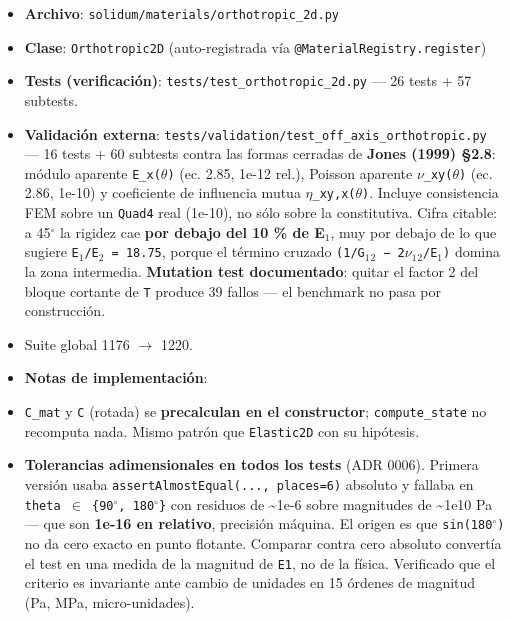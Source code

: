 \documentclass[11pt,letterpaper,oneside]{report}
\begin{document}
\begin{itemize}
  \item \textbf{Archivo}: \texttt{solidum/materials/orthotropic\_2d.py}
  \item \textbf{Clase}: \texttt{Orthotropic2D} (auto-registrada vía \texttt{@MaterialRegistry.register})
  \item \textbf{Tests (verificación)}: \texttt{tests/test\_orthotropic\_2d.py} --- 26 tests + 57 subtests.
  \item \textbf{Validación externa}: \texttt{tests/validation/test\_off\_axis\_orthotropic.py} --- 16 tests + 60 subtests contra las formas cerradas de \textbf{Jones (1999) §2.8}: módulo aparente \texttt{E\_x(\ensuremath{\theta})} (ec. 2.85, 1e-12 rel.), Poisson aparente \texttt{\ensuremath{\nu}\_xy(\ensuremath{\theta})} (ec. 2.86, 1e-10) y coeficiente de influencia mutua \texttt{\ensuremath{\eta}\_xy,x(\ensuremath{\theta})}. Incluye consistencia FEM sobre un \texttt{Quad4} real (1e-10), no sólo sobre la constitutiva. Cifra citable: a 45\ensuremath{^{\circ}} la rigidez cae \textbf{por debajo del 10 \% de E\ensuremath{_{1}}}, muy por debajo de lo que sugiere \texttt{E\ensuremath{_{1}}/E\ensuremath{_{2}} = 18.75}, porque el término cruzado \texttt{(1/G\ensuremath{_{1}}\ensuremath{_{2}} − 2\ensuremath{\nu}\ensuremath{_{1}}\ensuremath{_{2}}/E\ensuremath{_{1}})} domina la zona intermedia. \textbf{Mutation test documentado}: quitar el factor 2 del bloque cortante de \texttt{T} produce 39 fallos --- el benchmark no pasa por construcción.
  \item Suite global 1176 \ensuremath{\to} 1220.
  \item \textbf{Notas de implementación}:
  \item \texttt{C\_mat} y \texttt{C} (rotada) se \textbf{precalculan en el constructor}; \texttt{compute\_state} no recomputa nada. Mismo patrón que \texttt{Elastic2D} con su hipótesis.
  \item \textbf{Tolerancias adimensionales en todos los tests} (ADR 0006). Primera versión usaba \texttt{assertAlmostEqual(..., places=6)} absoluto y fallaba en \texttt{theta \ensuremath{\in} \{90\ensuremath{^{\circ}}, 180\ensuremath{^{\circ}}\}} con residuos de \textasciitilde{}1e-6 sobre magnitudes de \textasciitilde{}1e10 Pa --- que son \textbf{1e-16 en relativo}, precisión máquina. El origen es que \texttt{sin(180\ensuremath{^{\circ}})} no da cero exacto en punto flotante. Comparar contra cero absoluto convertía el test en una medida de la magnitud de \texttt{E1}, no de la física. Verificado que el criterio es invariante ante cambio de unidades en 15 órdenes de magnitud (Pa, MPa, micro-unidades).

\end{itemize}
\end{document}

